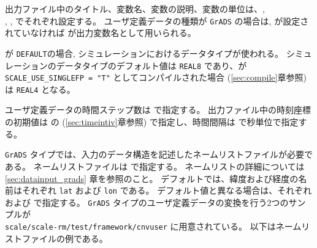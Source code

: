 出力ファイル中のタイトル、変数名、変数の説明、変数の単位は、, \\
, ,  でそれぞれ設定する。
ユーザ定義データの種類が \verb|GrADS| の場合は,  が設定されていなければ  が出力変数名として用いられる。

 が \verb|DEFAULT|の場合, シミュレーションにおけるデータタイプが使われる。
シミュレーションのデータタイプのデフォルト値は \verb|REAL8| であり、\scalerm が \\
\verb|SCALE_USE_SINGLEFP = "T"| としてコンパイルされた場合 (\ref{sec:compile}章参照) は \verb|REAL4| となる。


ユーザ定義データの時間ステップ数は  で指定する。
出力ファイル中の時刻座標の初期値は  の  (\ref{sec:timeintiv}章参照) で指定し、時間間隔は  で秒単位で指定する。


\verb|GrADS| タイプでは、入力のデータ構造を記述したネームリストファイルが必要である。
ネームリストファイルは  で指定する。
ネームリストの詳細については \ref{sec:datainput_grads} 章を参照のこと。
デフォルトでは、緯度および経度の名前はそれぞれ \verb|lat| および \verb|lon| である。
デフォルト値と異なる場合は、それぞれ  および  で指定する。
\verb|GrADS| タイプのユーザ定義データの変換を行う2つのサンプルが \\
\verb|scale/scale-rm/test/framework/cnvuser| に用意されている。
以下はネームリストファイルの例である。



